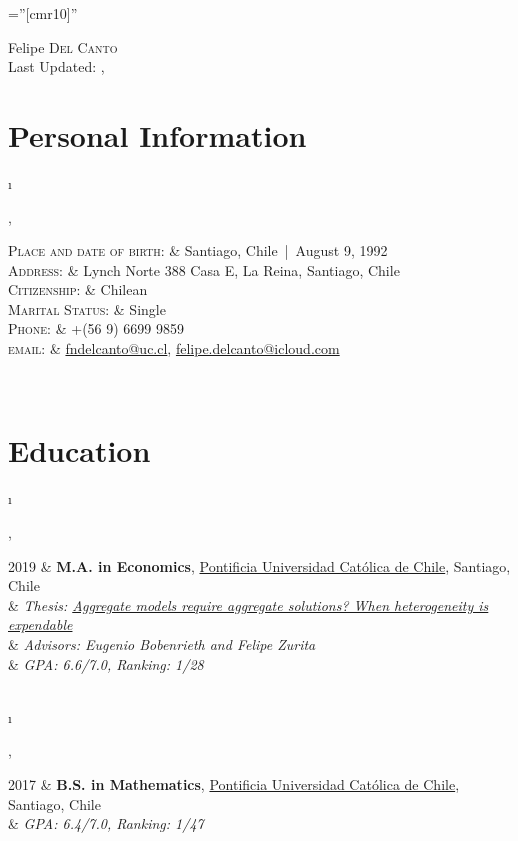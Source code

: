 \documentclass[a4paper, margins=2cm,10pt]{article}
\newcommand{\tablength}{}
\newcommand{\setTabParams}[1]{\renewcommand\tablength{}\forcsvlist{\listadd\tablength}{#1}}
\newcommand{\setCols}[1]{			%
	\ifnum0=\i						%
		\ifdim0cm=#1				%
			\def \firstCol {r}		%
		\else						%
			\def \firstCol {p{#1}}		%
		\fi						%
	\else \ifnum1=\i				%
		\ifdim0cm=#1				%
			\def \secondCol {l}		%
		\else						%
			\def \secondCol{p{#1}}	%
		\fi						%
	\else \ifnum2=\i				%
		\ifnum0=#1				%
			\def \sep {}			%
		\else						%
			\def \sep {|}			%
		\fi						%
	\fi \fi \fi						%
	\advance\i by1					%
}
\newcommand{\tab}[1]{					%
	\newcount\i						%
	\forlistloop{\setCols}{\tablength}		%
	\begin{tabular}{\firstCol \sep \secondCol}	%
		#1							%
	\end{tabular} \\						%
}
\begin{document}
\pagestyle{empty} %

\font\fb=''[cmr10]'' %

\par{\centering
		{{\Huge Felipe \textsc{Del Canto}}	\\[1.5ex]
		 {\large Last Updated: \monthname, \the\year }
	}\par}

\section{Personal Information}
\setTabParams{0cm,0cm,0}

\tab{
    \textsc{Place and date of birth:}	&	Santiago, Chile\,  |\, August 9, 1992								\\[0.2ex]
    \textsc{Address:}   			&	Lynch Norte 388 Casa E, La Reina, Santiago, Chile					\\[0.2ex]
    \textsc{Citizenship:}			&	Chilean													\\[0.2ex]
    \textsc{Marital Status:}			&	Single													\\[0.2ex]
    \textsc{Phone:}	   			&	+(56 9) 6699 9859											\\[0.2ex]
    \textsc{email:}     				&	\href{mailto:fndelcanto@uc.cl}{fndelcanto@uc.cl},
    								\href{mailto:felipe.delcanto@icloud.com}{felipe.delcanto@icloud.com}
}

\section{Education}
\setTabParams{0cm,0cm,0}

\tab{
\textsc{2019}
	&	\textbf{M.A. in Economics}, \href{https://economia.uc.cl/programas-academicos/magister-en-economia/}{Pontificia Universidad Católica de Chile}, Santiago, Chile											\\[0.2ex]
	&	\emph{\quad Thesis: \href{https://economia.uc.cl/wp-content/uploads/2020/01/tesis-DelCanto-2019.pdf}{Aggregate models require aggregate solutions? When heterogeneity is expendable}}				\\[0.2ex]
	&	\emph{\quad Advisors: Eugenio Bobenrieth and Felipe Zurita}	\\[0.2ex]
	&	\emph{\quad GPA: 6.6/7.0, Ranking: 1/28}
}

\tab{
\textsc{2017}
	& 	\textbf{B.S. in Mathematics}, \href{http://www.mat.uc.cl/?lang=en}{Pontificia Universidad Católica de Chile}, Santiago, Chile	\\[0.2ex]
	&	\emph{\quad GPA: 6.4/7.0, Ranking: 1/47}
}
\end{document}
